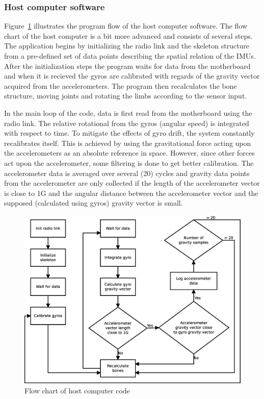 \documentclass[a4paper, 12pt]{article}
\begin{document}
\subsubsection*{Host computer software}
Figure~\ref{fig:pic4} illustrates the program flow of the host computer software.
The flow chart of the host computer is a bit more advanced and consists of several steps. The application begins by initializing the radio link and the skeleton structure from a pre-defined set of data points describing the spatial relation of the IMUs. After the initialization steps the program waits for data from the motherboard and when it is recieved the gyros are calibrated with regards of the gravity vector acquired from the accelerometers. The program then recalculates the bone structure, moving joints and rotating the limbs according to the sensor input.

In the main loop of the code, data is first read from the motherboard using the radio link. The relative rotational  from the gyros (angular speed) is integrated with respect to time. To mitigate the effects of gyro drift, the system constantly recalibrates itself. This is achieved by using the gravitational force acting upon the accelerometers as an absolute reference in space. However, since other forces act upon the accelerometer, some filtering is done to get better calibration. The accelerometer data is averaged over several (20) cycles and gravity data points from the accelerometer are only collected if the length of the accelerometer vector is close to 1G and the angular distance between the accelerometer vector and the supposed (calculated using gyros) gravity vector is small.

\begin{figure}[h!] %
    \centering
    \includegraphics[scale=0.38]{pi.eps}
    \caption{Flow chart of host computer code}
    \label{fig:pic4}
\end{figure}
\end{document}
